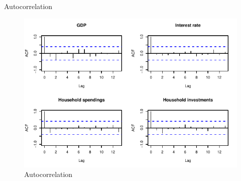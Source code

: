 \documentclass[11pt,ignorenonframetext,]{beamer}
\begin{document}
\begin{frame}{Autocorrelation}
\protect\hypertarget{autocorrelation}{}

\FloatBarrier

\tiny

\begin{figure}[!htbp]

{\centering \includegraphics{presentation_files/figure-beamer/unnamed-chunk-25-1} 

}

\caption{Autocorrelation}\label{fig:unnamed-chunk-25}
\end{figure}

\normalsize

\end{frame}
\end{document}
